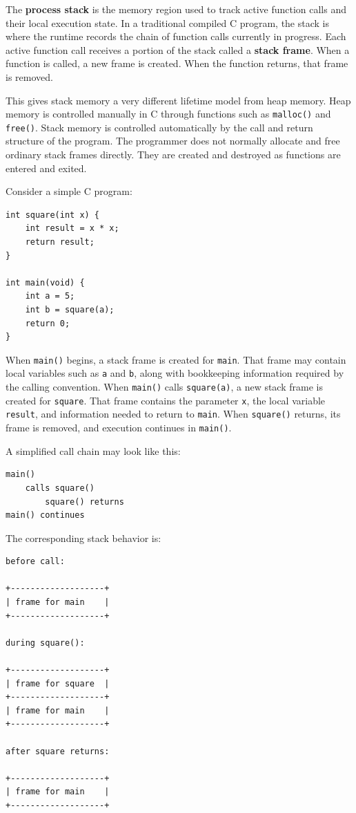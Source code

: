 The \textbf{process stack} is the memory region used to track active function calls and their local execution state. In a traditional compiled C program, the stack is where the runtime records the chain of function calls currently in progress. Each active function call receives a portion of the stack called a \textbf{stack frame}. When a function is called, a new frame is created. When the function returns, that frame is removed.

This gives stack memory a very different lifetime model from heap memory. Heap memory is controlled manually in C through functions such as \texttt{malloc()} and \texttt{free()}. Stack memory is controlled automatically by the call and return structure of the program. The programmer does not normally allocate and free ordinary stack frames directly. They are created and destroyed as functions are entered and exited.

Consider a simple C program:

\begin{verbatim}
int square(int x) {
    int result = x * x;
    return result;
}

int main(void) {
    int a = 5;
    int b = square(a);
    return 0;
}
\end{verbatim}

When \texttt{main()} begins, a stack frame is created for \texttt{main}. That frame may contain local variables such as \texttt{a} and \texttt{b}, along with bookkeeping information required by the calling convention. When \texttt{main()} calls \texttt{square(a)}, a new stack frame is created for \texttt{square}. That frame contains the parameter \texttt{x}, the local variable \texttt{result}, and information needed to return to \texttt{main}. When \texttt{square()} returns, its frame is removed, and execution continues in \texttt{main()}.

A simplified call chain may look like this:

\begin{verbatim}
main()
    calls square()
        square() returns
main() continues
\end{verbatim}

The corresponding stack behavior is:

\begin{verbatim}
before call:

+-------------------+
| frame for main    |
+-------------------+

during square():

+-------------------+
| frame for square  |
+-------------------+
| frame for main    |
+-------------------+

after square returns:

+-------------------+
| frame for main    |
+-------------------+
\end{verbatim}

